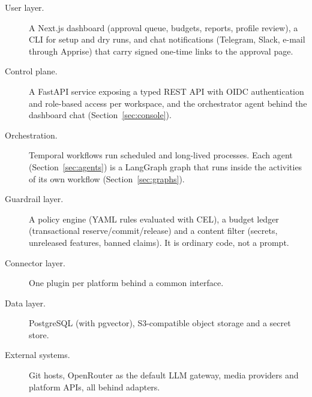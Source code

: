 \documentclass[11pt,a4paper]{article}
\begin{document}
\begin{description}
  \item[User layer.] A Next.js dashboard (approval queue, budgets, reports, profile review), a CLI for setup and dry runs, and chat notifications (Telegram, Slack, e-mail through Apprise) that carry signed one-time links to the approval page.
  \item[Control plane.] A FastAPI service exposing a typed REST API with OIDC authentication and role-based access per workspace, and the orchestrator agent behind the dashboard chat (Section~\ref{sec:console}).
  \item[Orchestration.] Temporal workflows run scheduled and long-lived processes. Each agent (Section~\ref{sec:agents}) is a LangGraph graph that runs inside the activities of its own workflow (Section~\ref{sec:graphs}).
  \item[Guardrail layer.] A policy engine (YAML rules evaluated with CEL), a budget ledger (transactional reserve/commit/release) and a content filter (secrets, unreleased features, banned claims). It is ordinary code, not a prompt.
  \item[Connector layer.] One plugin per platform behind a common interface.
  \item[Data layer.] PostgreSQL (with pgvector), S3-compatible object storage and a secret store.
  \item[External systems.] Git hosts, OpenRouter as the default LLM gateway, media providers and platform APIs, all behind adapters.
\end{description}
\end{document}
